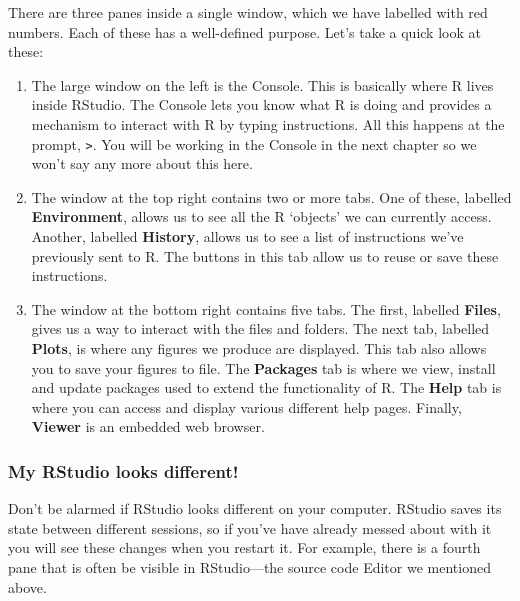 \documentclass[
]{book}
\newenvironment{greybox}{
  \definecolor{shadecolor}{rgb}{0.95,0.95,0.95}  %
  \color{black}
  \begin{shaded}}
 {\end{shaded}}
\newenvironment{infobox}[1]
  {
  \begin{itemize}
  \renewcommand{\labelitemi}{
    \raisebox{-.7\height}[0pt][0pt]{
      {\setkeys{Gin}{width=3em,keepaspectratio}
        \texttt{[image: images/\#1]}}
    }
  }
  \setlength{\fboxsep}{1em}
  \begin{greybox}
  \item
  }
  {
  \end{greybox}
  \end{itemize}
  }
\begin{document}
There are three panes inside a single window, which we have labelled with red numbers. Each of these has a well-defined purpose. Let's take a quick look at these:

\begin{enumerate}
\def\labelenumi{\arabic{enumi}.}
\item
  The large window on the left is the Console. This is basically where R lives inside RStudio. The Console lets you know what R is doing and provides a mechanism to interact with R by typing instructions. All this happens at the prompt, \texttt{\textgreater{}}. You will be working in the Console in the next chapter so we won't say any more about this here.
\item
  The window at the top right contains two or more tabs. One of these, labelled \textbf{Environment}, allows us to see all the R `objects' we can currently access. Another, labelled \textbf{History}, allows us to see a list of instructions we've previously sent to R. The buttons in this tab allow us to reuse or save these instructions.
\item
  The window at the bottom right contains five tabs. The first, labelled \textbf{Files}, gives us a way to interact with the files and folders. The next tab, labelled \textbf{Plots}, is where any figures we produce are displayed. This tab also allows you to save your figures to file. The \textbf{Packages} tab is where we view, install and update packages used to extend the functionality of R. The \textbf{Help} tab is where you can access and display various different help pages. Finally, \textbf{Viewer} is an embedded web browser.
\end{enumerate}

\begin{infobox}{information}

\hypertarget{my-rstudio-looks-different}{%
\subsubsection*{My RStudio looks different!}\label{my-rstudio-looks-different}}

Don't be alarmed if RStudio looks different on your computer. RStudio saves its state between different sessions, so if you've have already messed about with it you will see these changes when you restart it. For example, there is a fourth pane that is often be visible in RStudio---the source code Editor we mentioned above.

\end{infobox}
\end{document}
